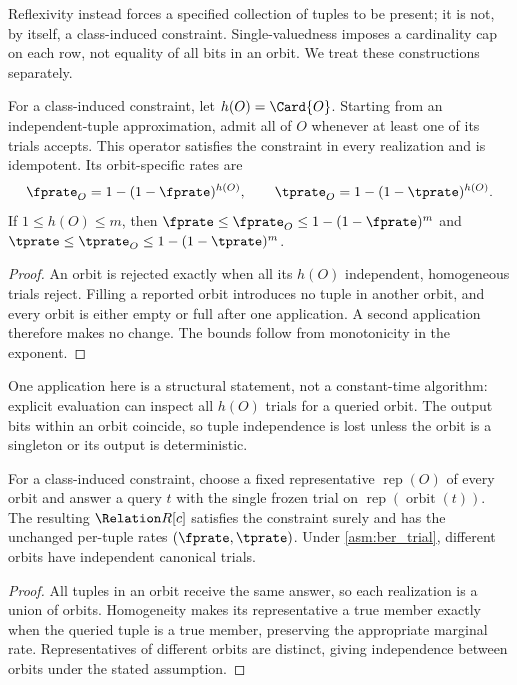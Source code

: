 \documentclass[ ../main.tex]{subfiles}
\begin{document}
Reflexivity instead forces a specified collection of tuples to be present;
it is not, by itself, a class-induced constraint. Single-valuedness imposes a
cardinality cap on each row, not equality of all bits in an orbit. We treat
these constructions separately.

\begin{theorem}
\label{thm:local_closure}
For a class-induced constraint, let $h(O)=\Card{O}$. Starting from an
independent-tuple approximation, admit all of $O$ whenever at least one of its
trials accepts. This operator satisfies the constraint in every realization
and is idempotent. Its orbit-specific rates are
\begin{equation}
 \fprate_O=1-(1-\fprate)^{h(O)},\qquad
 \tprate_O=1-(1-\tprate)^{h(O)}.
\end{equation}
If $1\le h(O)\le m$, then
$\fprate\le\fprate_O\le1-(1-\fprate)^m$ and
$\tprate\le\tprate_O\le1-(1-\tprate)^m$.
\end{theorem}
\begin{proof}
An orbit is rejected exactly when all its $h(O)$ independent, homogeneous trials
reject. Filling a reported orbit introduces no tuple in another orbit, and
every orbit is either empty or full after one application. A second application
therefore makes no change. The bounds follow from monotonicity in the exponent.
\end{proof}

One application here is a structural statement, not a constant-time algorithm:
explicit evaluation can inspect all $h(O)$ trials for a queried orbit. The
output bits within an orbit coincide, so tuple independence is lost unless the
orbit is a singleton or its output is deterministic.

\begin{theorem}
\label{thm:canonical_test}
For a class-induced constraint, choose a fixed representative
$\operatorname{rep}(O)$ of every orbit and answer a query $t$ with the single
frozen trial on $\operatorname{rep}(\operatorname{orbit}(t))$. The resulting
$\ARelation{R}[c]$ satisfies the constraint surely and has the unchanged
per-tuple rates $(\fprate,\tprate)$. Under \cref{asm:ber_trial}, different
orbits have independent canonical trials.
\end{theorem}
\begin{proof}
All tuples in an orbit receive the same answer, so each realization is a union
of orbits. Homogeneity makes its representative a true member exactly when the
queried tuple is a true member, preserving the appropriate marginal rate.
Representatives of different orbits are distinct, giving independence between
orbits under the stated assumption.
\end{proof}
\end{document}
